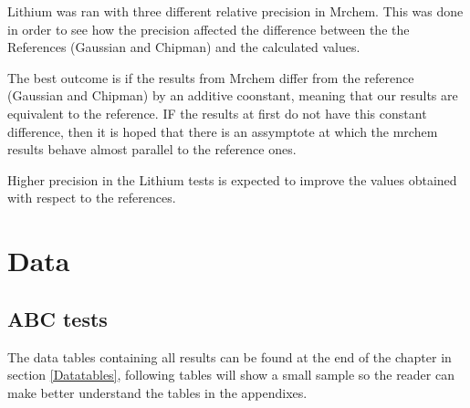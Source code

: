 \documentclass[../master_thesis.tex]{subfiles}
\begin{document}
Lithium was ran with three different relative precision in Mrchem. This was done
in order to see how the precision affected the difference between the the References
(Gaussian and Chipman) and the calculated values.

The best outcome is if the results from Mrchem differ from the reference (Gaussian and Chipman)
by an additive coonstant, meaning that our results are equivalent to the reference.
IF the results at first do not have this constant difference, then it is hoped that
there is an assymptote at which the mrchem results behave almost parallel to
the reference ones.

Higher precision in the Lithium tests is expected to improve the values obtained
with respect to the references.

\section{Data}
\subsection{\ac{ABC} tests}
The data tables containing all results can be found at the end of the chapter in section \ref{Datatables}, following
tables will show a small sample so the reader can make better understand the tables
in the appendixes.
\end{document}
